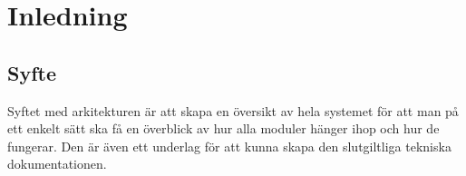 \section{Inledning}

\subsection{Syfte}
Syftet med arkitekturen är att skapa en översikt av hela systemet för att man på ett enkelt sätt ska få en överblick av hur alla moduler hänger ihop och hur de fungerar. Den är även ett underlag för att kunna skapa den slutgiltliga tekniska dokumentationen.
